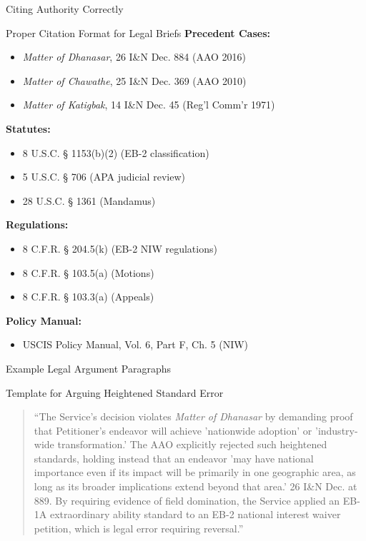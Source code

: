 \documentclass[11pt]{beamer}
\begin{document}
	\begin{frame}{Citing Authority Correctly}
		\scriptsize
		\begin{block}{Proper Citation Format for Legal Briefs}
			\textbf{Precedent Cases:}
			\begin{itemize}
				\item \textit{Matter of Dhanasar}, 26 I\&N Dec. 884 (AAO 2016)
				\item \textit{Matter of Chawathe}, 25 I\&N Dec. 369 (AAO 2010)
				\item \textit{Matter of Katigbak}, 14 I\&N Dec. 45 (Reg’l Comm’r 1971)
			\end{itemize}
			\textbf{Statutes:}
			\begin{itemize}
				\item 8 U.S.C. § 1153(b)(2) (EB-2 classification)
				\item 5 U.S.C. § 706 (APA judicial review)
				\item 28 U.S.C. § 1361 (Mandamus)
			\end{itemize}
			\textbf{Regulations:}
			\begin{itemize}
				\item 8 C.F.R. § 204.5(k) (EB-2 NIW regulations)
				\item 8 C.F.R. § 103.5(a) (Motions)
				\item 8 C.F.R. § 103.3(a) (Appeals)
			\end{itemize}
			\textbf{Policy Manual:}
			\begin{itemize}
				\item USCIS Policy Manual, Vol. 6, Part F, Ch. 5 (NIW)
			\end{itemize}
		\end{block}
	\end{frame}
	
	\begin{frame}{Example Legal Argument Paragraphs}
		\scriptsize
		\begin{block}{Template for Arguing Heightened Standard Error}
			\begin{quote}
				``The Service's decision violates \textit{Matter of Dhanasar} by demanding proof that Petitioner's endeavor will achieve 'nationwide adoption' or 'industry-wide transformation.' The AAO explicitly rejected such heightened standards, holding instead that an endeavor 'may have national importance even if its impact will be primarily in one geographic area, as long as its broader implications extend beyond that area.' 26 I\&N Dec. at 889. By requiring evidence of field domination, the Service applied an EB-1A extraordinary ability standard to an EB-2 national interest waiver petition, which is legal error requiring reversal.''
			\end{quote}
		\end{block}
	\end{frame}
	
\end{document}
